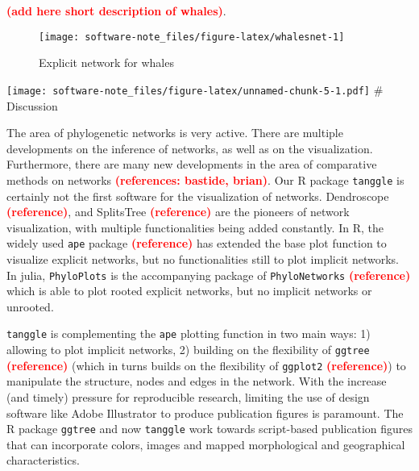 \documentclass[]{IEEEtran}
\begin{document}
\textcolor{red}{\textbf{(add here short description of whales)}}.

\begin{figure}[H]

{\centering \texttt{[image: software-note\_files/figure-latex/whalesnet-1]} 

}

\caption{Explicit network for whales}\label{fig:whalesnet}
\end{figure}

\texttt{[image: software-note\_files/figure-latex/unnamed-chunk-5-1.pdf]}
\# Discussion

The area of phylogenetic networks is very active. There are multiple
developments on the inference of networks, as well as on the
visualization. Furthermore, there are many new developments in the area
of comparative methods on networks
\textcolor{red}{\textbf{(references: bastide, brian)}}. Our R package
\texttt{tanggle} is certainly not the first software for the
visualization of networks. Dendroscope
\textcolor{red}{\textbf{(reference)}}, and SplitsTree
\textcolor{red}{\textbf{(reference)}} are the pioneers of network
visualization, with multiple functionalities being added constantly. In
R, the widely used \texttt{ape} package
\textcolor{red}{\textbf{(reference)}} has extended the base plot
function to visualize explicit networks, but no functionalities still to
plot implicit networks. In julia, \texttt{PhyloPlots} is the
accompanying package of \texttt{PhyloNetworks}
\textcolor{red}{\textbf{(reference)}} which is able to plot rooted
explicit networks, but no implicit networks or unrooted.

\texttt{tanggle} is complementing the \texttt{ape} plotting function in
two main ways: 1) allowing to plot implicit networks, 2) building on the
flexibility of \texttt{ggtree} \textcolor{red}{\textbf{(reference)}}
(which in turns builds on the flexibility of \texttt{ggplot2}
\textcolor{red}{\textbf{(reference)}}) to manipulate the structure,
nodes and edges in the network. With the increase (and timely) pressure
for reproducible research, limiting the use of design software like
Adobe Illustrator to produce publication figures is paramount. The R
package \texttt{ggtree} and now \texttt{tanggle} work towards
script-based publication figures that can incorporate colors, images and
mapped morphological and geographical characteristics.


\end{document}
